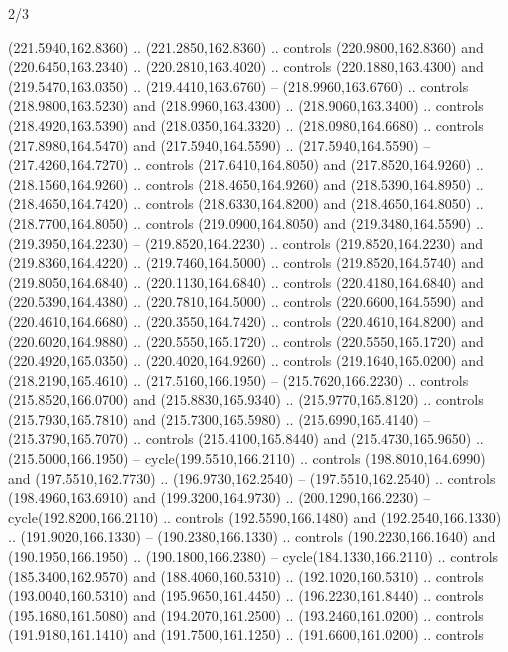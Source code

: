 \begin{flagdescription}{2/3}
\begin{scope}[xshift=0.5\flaglength,yshift=0.5\flagwidth,scale=\flagwidth/259.2]
\begin{scope}[y=0.8pt, x=0.8pt, yscale=-1,shift={(-243,-162)}]
      (221.5940,162.8360) .. (221.2850,162.8360) .. controls (220.9800,162.8360) and
      (220.6450,163.2340) .. (220.2810,163.4020) .. controls (220.1880,163.4300) and
      (219.5470,163.0350) .. (219.4410,163.6760) -- (218.9960,163.6760) .. controls
      (218.9800,163.5230) and (218.9960,163.4300) .. (218.9060,163.3400) .. controls
      (218.4920,163.5390) and (218.0350,164.3320) .. (218.0980,164.6680) .. controls
      (217.8980,164.5470) and (217.5940,164.5590) .. (217.5940,164.5590) --
      (217.4260,164.7270) .. controls (217.6410,164.8050) and (217.8520,164.9260) ..
      (218.1560,164.9260) .. controls (218.4650,164.9260) and (218.5390,164.8950) ..
      (218.4650,164.7420) .. controls (218.6330,164.8200) and (218.4650,164.8050) ..
      (218.7700,164.8050) .. controls (219.0900,164.8050) and (219.3480,164.5590) ..
      (219.3950,164.2230) -- (219.8520,164.2230) .. controls (219.8520,164.2230) and
      (219.8360,164.4220) .. (219.7460,164.5000) .. controls (219.8520,164.5740) and
      (219.8050,164.6840) .. (220.1130,164.6840) .. controls (220.4180,164.6840) and
      (220.5390,164.4380) .. (220.7810,164.5000) .. controls (220.6600,164.5590) and
      (220.4610,164.6680) .. (220.3550,164.7420) .. controls (220.4610,164.8200) and
      (220.6020,164.9880) .. (220.5550,165.1720) .. controls (220.5550,165.1720) and
      (220.4920,165.0350) .. (220.4020,164.9260) .. controls (219.1640,165.0200) and
      (218.2190,165.4610) .. (217.5160,166.1950) -- (215.7620,166.2230) .. controls
      (215.8520,166.0700) and (215.8830,165.9340) .. (215.9770,165.8120) .. controls
      (215.7930,165.7810) and (215.7300,165.5980) .. (215.6990,165.4140) --
      (215.3790,165.7070) .. controls (215.4100,165.8440) and (215.4730,165.9650) ..
      (215.5000,166.1950) -- cycle(199.5510,166.2110) .. controls
      (198.8010,164.6990) and (197.5510,162.7730) .. (196.9730,162.2540) --
      (197.5510,162.2540) .. controls (198.4960,163.6910) and (199.3200,164.9730) ..
      (200.1290,166.2230) -- cycle(192.8200,166.2110) .. controls
      (192.5590,166.1480) and (192.2540,166.1330) .. (191.9020,166.1330) --
      (190.2380,166.1330) .. controls (190.2230,166.1640) and (190.1950,166.1950) ..
      (190.1800,166.2380) -- cycle(184.1330,166.2110) .. controls
      (185.3400,162.9570) and (188.4060,160.5310) .. (192.1020,160.5310) .. controls
      (193.0040,160.5310) and (195.9650,161.4450) .. (196.2230,161.8440) .. controls
      (195.1680,161.5080) and (194.2070,161.2500) .. (193.2460,161.0200) .. controls
      (191.9180,161.1410) and (191.7500,161.1250) .. (191.6600,161.0200) .. controls

\end{scope}
\end{scope}
\end{flagdescription}
